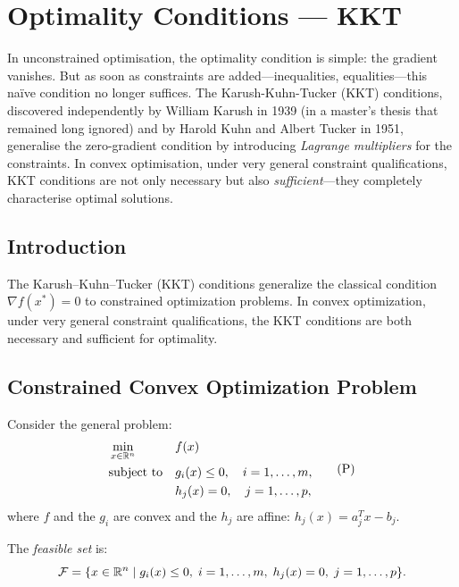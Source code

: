 \chapter{Optimality Conditions --- KKT}
\label{ch:kkt}

In unconstrained optimisation, the optimality condition is simple: the gradient vanishes. But as soon as constraints are added---inequalities, equalities---this na\"ive condition no longer suffices. The Karush-Kuhn-Tucker (KKT) conditions, discovered independently by William Karush in 1939 (in a master's thesis that remained long ignored) and by Harold Kuhn and Albert Tucker in 1951, generalise the zero-gradient condition by introducing \emph{Lagrange multipliers} for the constraints. In convex optimisation, under very general constraint qualifications, KKT conditions are not only necessary but also \emph{sufficient}---they completely characterise optimal solutions.

\section{Introduction}

The Karush--Kuhn--Tucker (KKT) conditions generalize the classical condition
$\nabla f(x^*) = 0$ to constrained optimization problems. In convex optimization,
under very general constraint qualifications, the KKT conditions are both necessary
and sufficient for optimality.

\section{Constrained Convex Optimization Problem}

Consider the general problem:
\[
    \begin{aligned}
        & \min_{x \in \mathbb{R}^n} && f(x) \\
        & \text{subject to} && g_i(x) \leq 0, \quad i = 1, \ldots, m, \\
        & && h_j(x) = 0, \quad j = 1, \ldots, p,
    \end{aligned}
    \tag{P}
\]
where $f$ and the $g_i$ are convex and the $h_j$ are affine: $h_j(x) = a_j^T x - b_j$.

\begin{definition}
The \emph{feasible set} is:
\[
    \mathcal{F} = \{x \in \mathbb{R}^n \mid g_i(x) \leq 0, \; i=1,\ldots,m, \;
    h_j(x) = 0, \; j=1,\ldots,p\}.
\]
\end{definition}


